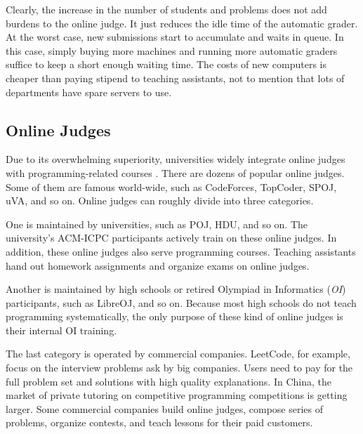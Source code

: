             Clearly, the increase in the number of students and problems does not add burdens to the online judge.
            It just reduces the idle time of the automatic grader.
            At the worst case, new submissions start to accumulate and waits in queue.
            In this case, simply buying more machines and running more automatic graders
            suffice to keep a short enough waiting time.
            The costs of new computers is cheaper than paying stipend to teaching assistants,
            not to mention that lots of departments have spare servers to use.

    \subsection{Online Judges}

        Due to its overwhelming superiority,
        universities widely integrate online judges with programming-related courses \cite{Li2005}.
        There are dozens of popular online judges.
        Some of them are famous world-wide, such as CodeForces\cite{CodeForces}, TopCoder\cite{Topcoder},
        SPOJ\cite{SPOJ}, uVA\cite{uva}, and so on.
        Online judges can roughly divide into three categories.

        One is maintained by universities, such as POJ\cite{poj}, HDU\cite{hdu}, and so on.
        The university's ACM-ICPC participants actively train on these online judges.
        In addition, these online judges also serve programming courses.
        Teaching assistants hand out homework assignments and organize exams on online judges.

        Another is maintained by high schools
        or retired Olympiad in Informatics (\emph{OI}) participants,
        such as LibreOJ\cite{loj}, and so on.
        Because most high schools do not teach programming systematically,
        the only purpose of these kind of online judges is their internal OI training.

        The last category is operated by commercial companies.
        LeetCode\cite{leetcode}, for example, focus on the interview problems ask by big companies.
        Users need to pay for the full problem set and solutions with high quality explanations.
        In China, the market of private tutoring on competitive programming competitions is getting larger.
        Some commercial companies build online judges, compose series of problems, organize contests,
        and teach lessons for their paid customers.

